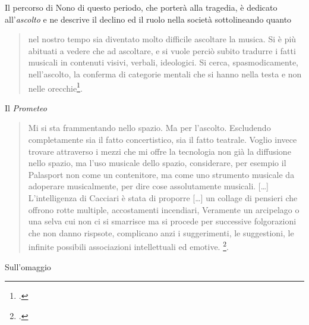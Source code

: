 Il percorso di Nono di questo periodo, che porterà alla tragedia, è dedicato all'\emph{ascolto} e ne descrive il declino ed il ruolo nella società sottolineando quanto

\begin{quote}
nel nostro tempo sia diventato molto difficile ascoltare la musica. Si è più abituati a vedere che ad ascoltare, e si vuole perciò subito tradurre i fatti musicali in contenuti visivi, verbali, ideologici. Si cerca, spasmodicamente, nell'ascolto, la conferma di categorie mentali che si hanno nella testa e non nelle orecchie\footcite[vol. II p. 259, \emph{Intervista di Dino Villatico} 1981]{nono:scrcol}.
\end{quote}

Il \emph{Prometeo}

\begin{quote}
Mi si sta frammentando nello spazio. Ma per l'ascolto. Escludendo completamente sia il fatto concertistico, sia il fatto teatrale. Voglio invece trovare attraverso i mezzi che mi offre la tecnologia non già la diffusione nello spazio, ma l'uso musicale dello spazio, considerare, per esempio il Palasport non come un contenitore, ma come uno strumento musicale da adoperare musicalmente, per dire cose assolutamente musicali. [\ldots] L'intelligenza di Cacciari è stata di proporre [\ldots] un collage di pensieri che offrono rotte multiple, accostamenti incendiari, Veramente un arcipelago o una selva cui non ci si smarrisce ma si procede per successive folgorazioni che non danno rispsote, complicano anzi i suggerimenti, le suggestioni, le infinite possibili associazioni intellettuali ed emotive. \footcite[vol. II p. 259-260, \emph{Intervista di Dino Villatico} 1981]{nono:scrcol}.
\end{quote}

%
%
Sull'omaggio

